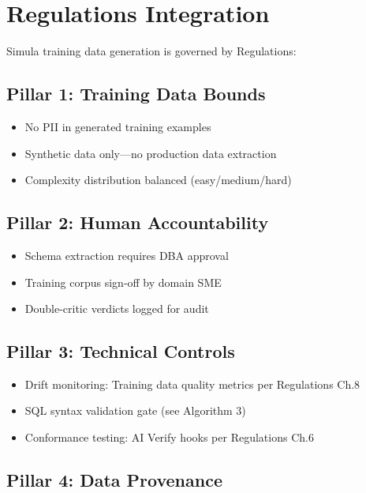 \documentclass[12pt,a4paper,twoside]{report}
\begin{document}
\section{Regulations Integration}
\label{sec:reg-integration}

Simula training data generation is governed by Regulations:

\subsection{Pillar 1: Training Data Bounds}

\begin{itemize}
\item No PII in generated training examples
\item Synthetic data only---no production data extraction
\item Complexity distribution balanced (easy/medium/hard)
\end{itemize}

\subsection{Pillar 2: Human Accountability}

\begin{itemize}
\item Schema extraction requires DBA approval
\item Training corpus sign-off by domain SME
\item Double-critic verdicts logged for audit
\end{itemize}

\subsection{Pillar 3: Technical Controls}

\begin{itemize}
\item Drift monitoring: Training data quality metrics per Regulations Ch.8
\item SQL syntax validation gate (see Algorithm 3)
\item Conformance testing: AI Verify hooks per Regulations Ch.6
\end{itemize}

\subsection{Pillar 4: Data Provenance}
\end{document}
